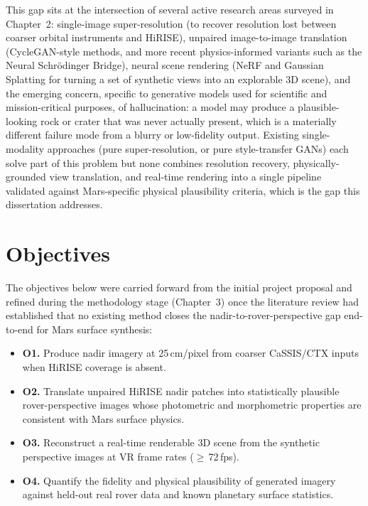 This gap sits at the intersection of several active research areas surveyed in Chapter~2: single-image super-resolution (to recover resolution lost between coarser orbital instruments and HiRISE), unpaired image-to-image translation (CycleGAN-style methods, and more recent physics-informed variants such as the Neural Schr\"{o}dinger Bridge), neural scene rendering (NeRF and Gaussian Splatting for turning a set of synthetic views into an explorable 3D scene), and the emerging concern, specific to generative models used for scientific and mission-critical purposes, of hallucination: a model may produce a plausible-looking rock or crater that was never actually present, which is a materially different failure mode from a blurry or low-fidelity output. Existing single-modality approaches (pure super-resolution, or pure style-transfer GANs) each solve part of this problem but none combines resolution recovery, physically-grounded view translation, and real-time rendering into a single pipeline validated against Mars-specific physical plausibility criteria, which is the gap this dissertation addresses.

\section{Objectives}

The objectives below were carried forward from the initial project proposal and refined during the methodology stage (Chapter~3) once the literature review had established that no existing method closes the nadir-to-rover-perspective gap end-to-end for Mars surface synthesis:

\begin{itemize}
	\item \textbf{O1.} Produce nadir imagery at 25\,cm/pixel from coarser CaSSIS/CTX inputs when HiRISE coverage is absent.
	\item \textbf{O2.} Translate unpaired HiRISE nadir patches into statistically plausible rover-perspective images whose photometric and morphometric properties are consistent with Mars surface physics.
	\item \textbf{O3.} Reconstruct a real-time renderable 3D scene from the synthetic perspective images at VR frame rates ($\geq$\,72\,fps).
	\item \textbf{O4.} Quantify the fidelity and physical plausibility of generated imagery against held-out real rover data and known planetary surface statistics.
\end{itemize}

